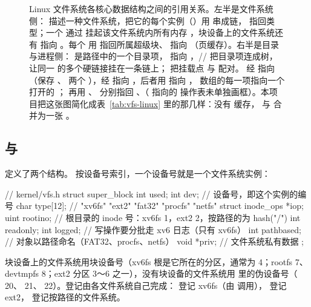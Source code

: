 \begin{figure}
  \centering
  \resizebox{\linewidth}{!}{}
  \caption{Linux 文件系统各核心数据结构之间的引用关系。左半是文件系统侧： 描述一种文件系统，把它的每个实例（）用  串成链， 指回类型；一个  通过  挂起该文件系统内所有内存 ，块设备上的文件系统还有  指向 。每个  用  指回所属超级块、 指向 （页缓存）。右半是目录与进程侧： 是路径中的一个目录项， 指向 ，// 把目录项连成树， 让同一  的多个硬链接挂在一条链上； 把挂载点  与  配对。 经  指向 （保存 、 两个 ），经  指向 ，后者用  指向 ， 数组的每一项指向一个打开的 ； 再用 、 分别指回 、（ 指向的  操作表未单独画框）。本项目把这张图简化成表~\ref{tab:vfs-linux} 里的那几样：没有  缓存， 与  合并为一张 。}
  \label{fig:vfs-structs}
\end{figure}

\subsection{ 与 }

 定义了两个结构。 按设备号索引，一个设备号就是一个文件系统实例：

\begin{ccode}
// kernel/vfs.h
struct super_block {
  int    used;
  int    dev;          // 设备号，即这个实例的编号
  char   type[12];     // "xv6fs" "ext2" "fat32" "procfs" "netfs"
  struct inode_ops *iop;
  uint   rootino;      // 根目录的 inode 号：xv6fs 1，ext2 2，按路径的为 hash("/")
  int    readonly;
  int    logged;       // 写操作要分批走 xv6 日志（只有 xv6fs）
  int    pathbased;    // 对象以路径命名（FAT32、procfs、netfs）
  void   *priv;        // 文件系统私有数据
};
\end{ccode}

块设备上的文件系统用块设备号（xv6fs 根是它所在的分区，通常为 4；rootfs 7、devtmpfs 8；ext2 分区 3～6 之一），没有块设备的文件系统用  里的伪设备号（ 20、 21、 22）。登记由各文件系统自己完成： 登记 xv6fs（由  调用）， 登记 ext2， 登记按路径的文件系统。

